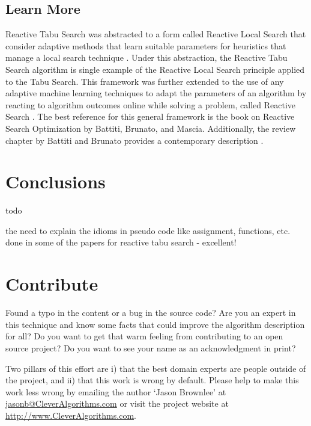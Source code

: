 \documentclass[a4paper, 11pt]{article}
\makeatletter
\newcommand{\myreportauthor}{Jason Brownlee}
\newcommand{\myreportemail}{jasonb@CleverAlgorithms.com}
\newcommand{\myreportwebsite}{http://www.CleverAlgorithms.com}
\makeatother
\begin{document}
\subsection{Learn More}
Reactive Tabu Search was abstracted to a form called Reactive Local Search that consider adaptive methods that learn suitable parameters for heuristics that manage a local search technique \cite{Battiti1995, Battiti2001}. Under this abstraction, the Reactive Tabu Search algorithm is single example of the Reactive Local Search principle applied to the Tabu Search. 
This framework was further extended to the use of any adaptive machine learning techniques to adapt the parameters of an algorithm by reacting to algorithm outcomes online while solving a problem, called Reactive Search \cite{Battiti1996}. The best reference for this general framework is the book on Reactive Search Optimization by Battiti, Brunato, and Mascia\cite{Battiti2008}. Additionally, the review chapter by Battiti and Brunato provides a contemporary description \cite{Battiti2009}.


% 
% 
\section{Conclusions}
\label{sec:conclusions}
todo

the need to explain the idioms in pseudo code like assignment, functions, etc.
done in some of the papers for reactive tabu search - excellent!


% 
% 
\section{Contribute}
\label{sec:contribute}
Found a typo in the content or a bug in the source code? 
Are you an expert in this technique and know some facts that could improve the algorithm description for all?
Do you want to get that warm feeling from contributing to an open source project? 
Do you want to see your name as an acknowledgment in print?

Two pillars of this effort are i) that the best domain experts are people outside of the project, and ii) that this work is wrong by default. 
Please help to make this work less wrong by emailing the author `\myreportauthor' at \url{\myreportemail} or visit the project website at \url{\myreportwebsite}.



\end{document}

